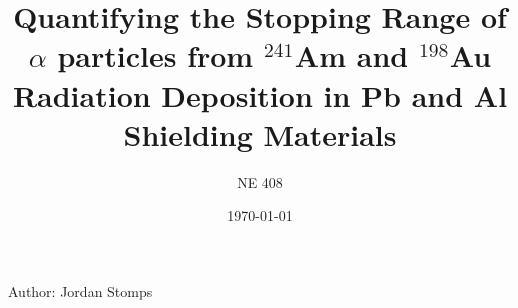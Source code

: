 \documentclass{article}
\title{Quantifying the Stopping Range of $\alpha$ particles from ${}^{241}$Am and ${}^{198}$Au Radiation Deposition in Pb and Al Shielding Materials}
\date{\today}
\author{NE 408}
\begin{document}
\maketitle











\pagebreak



\pagebreak
Author: Jordan Stomps
\end{document}
